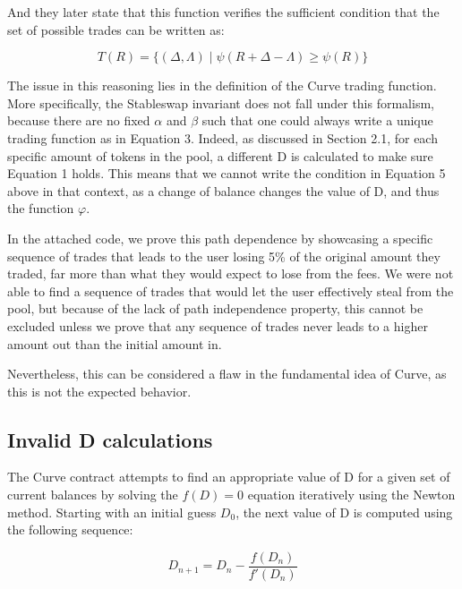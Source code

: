 \documentclass{article}
\begin{document}
    And they later state that this function verifies the sufficient condition that the set of possible trades can be written as: 

    \begin{equation}
        T(R)=\{(\Delta, \Lambda) \mid \psi(R+\Delta-\Lambda) \geq \psi(R)\}
    \end{equation}

    The issue in this reasoning lies in the definition of the Curve trading function. More specifically, the Stableswap invariant does not fall under this formalism, because there are no fixed $\alpha$ and $\beta$ such that one could always write a unique trading function as in Equation 3. Indeed, as discussed in Section 2.1, for each specific amount of tokens in the pool, a different D is calculated to make sure Equation 1 holds. This means that we cannot write the condition in Equation 5 above in that context, as a change of balance changes the value of D, and thus the function $\varphi$. 

    In the attached code, we prove this path dependence by showcasing a specific sequence of trades that leads to the user losing 5\% of the original amount they traded, far more than what they would expect to lose from the fees. We were not able to find a sequence of trades that would let the user effectively steal from the pool, but because of the lack of path independence property, this cannot be excluded unless we prove that any sequence of trades never leads to a higher amount out than the initial amount in.

    Nevertheless, this can be considered a flaw in the fundamental idea of Curve, as this is not the expected behavior. 

    \subsection{Invalid D calculations}
    
    The Curve contract attempts to find an appropriate value of D for a given set of current balances by solving the $f(D) = 0$ equation iteratively using the Newton method. Starting with an initial guess $D_{0}$, the next value of D is computed using the following sequence: 

    \begin{equation}
        D_{n+1} = D_{n} - \frac{f(D_{n})}{f'(D_{n})}
    \end{equation}
\end{document}
